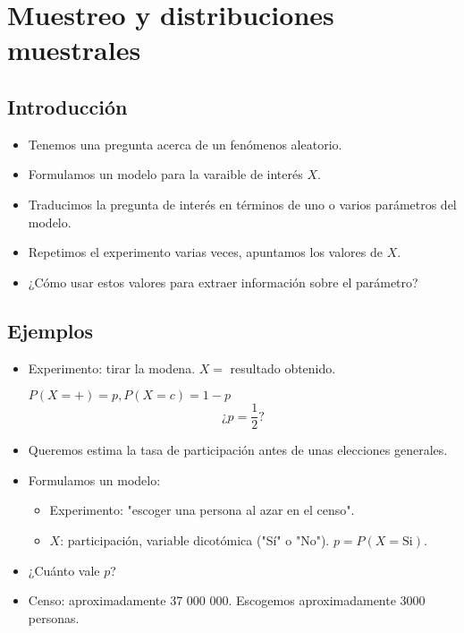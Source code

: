 \section{Muestreo y distribuciones muestrales}
\subsection{Introducción}
\begin{tcolorbox}[colback=blue!5!white, colframe=blue!75!black, title=\textbf{El contexto}]
\begin{itemize}[label=\textbullet]
    \item Tenemos una pregunta acerca de un fenómenos aleatorio.
    \item Formulamos un modelo para la varaible de interés $X$.
    \item Traducimos la pregunta de interés en términos de uno o varios parámetros del modelo.
    \item Repetimos el experimento varias veces, apuntamos los valores de  $X$.
    \item ¿Cómo usar estos valores para extraer información sobre el parámetro?
\end{itemize}
\end{tcolorbox}

\subsection{Ejemplos}

\begin{tcolorbox}[colback=blue!5!white, colframe=blue!75!black, title=\textbf{¿Está la moneda trucada?}]
\begin{itemize}[label=\textbullet]
    \item Experimento: tirar la modena. $X=$ resultado obtenido.

         $P(X=+)=p,P(X=c)=1-p$  \[
         \text{¿} p = \dfrac{1}{2}?
         \] 
\end{itemize}
\end{tcolorbox}

\begin{tcolorbox}[colback=blue!5!white, colframe=blue!75!black, title=\textbf{Sondeo sobre intención de participación en unas elecciones}]
\begin{itemize}[label=\textbullet]
    \item Queremos estima la tasa de participación antes de unas elecciones generales.
    \item Formulamos un modelo:
        \begin{itemize}[label=\textrightarrow]
            \item Experimento: "escoger una persona al azar en el censo".
            \item $X$: participación, variable dicotómica ("Sí" o "No").  $p=P(X=\text{Si})$.
        \end{itemize}
    \item ¿Cuánto vale $p$?
    \item Censo: aproximadamente 37 000 000. Escogemos aproximadamente 3000 personas.
\end{itemize}
\end{tcolorbox}

